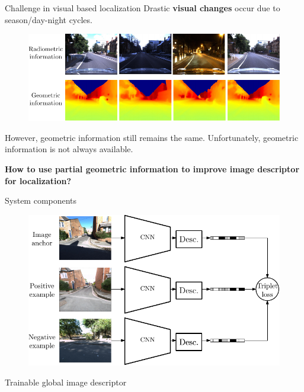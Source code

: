 \documentclass[final]{beamer}
\newlength{\colwidth}
\begin{document}
\begin{frame}[t]
\begin{columns}[t]
\begin{column}{\colwidth}
  \begin{block}{Challenge in visual based localization}
     Drastic \textbf{visual changes} occur due to season/day-night cycles.

	\begin{figure}
		\includegraphics[width=\linewidth]{vect/intro/fig4/radvsdepth}
	\end{figure}

	However, {geometric information} still remains the same. Unfortunately, geometric information is not always available.

	\textbf{How to use partial geometric information to improve image descriptor for localization?}
  \end{block}

  \begin{block}{System components}
    \begin{minipage}{0.75\linewidth}
        \centering
    	\begin{figure}
		  \includegraphics[width=\linewidth]{vect/method/fig2/3n}
		\end{figure}	
    \end{minipage}\hfill
    \begin{minipage}{0.23\linewidth}
      	{\footnotesize Trainable global image descriptor} 
    \end{minipage}
    

\end{block}
\end{column}
\end{columns}
\end{frame}
\end{document}
